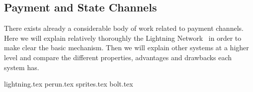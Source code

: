 \subsection{Payment and State Channels}
\label{sec:literaturereview:channels}
  There exists already a considerable body of work related to payment channels. Here we
  will explain relatively thoroughly the Lightning Network~\cite{lightning} in order to
  make clear the basic mechanism. Then we will explain other systems at a higher level and
  compare the different properties, advantages and drawbacks each system has.

  {lightning.tex}
  {perun.tex}
  {sprites.tex}
  {bolt.tex}
